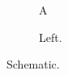 \documentclass{article}
\begin{document}
\begin{figure}
\begin{subfigure}{.4\textwidth}A\caption{Left.}\end{subfigure}
\caption{Schematic.}
\end{figure}
\begin{table}\caption{Values.}\end{table}
\end{document}
